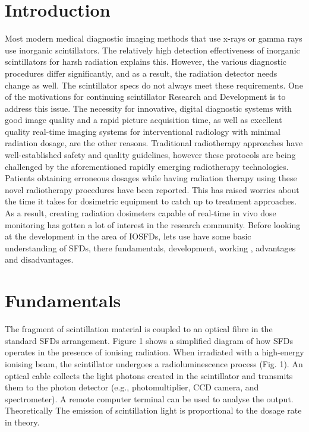 \documentclass{article}
\begin{document}
\begin{multicols}{2}

\section{Introduction}

Most modern medical diagnostic imaging methods that use x-rays or gamma rays use inorganic scintillators. The relatively high detection effectiveness of inorganic scintillators for harsh radiation explains this. However, the various diagnostic procedures differ significantly, and as a result, the radiation detector needs change as well. The scintillator specs do not always meet these requirements. One of the motivations for continuing scintillator Research and Development is to address this issue. The necessity for innovative, digital diagnostic systems with good image quality and a rapid picture acquisition time, as well as excellent quality real-time imaging systems for interventional radiology with minimal radiation dosage, are the other reasons. Traditional radiotherapy approaches have well-established safety and quality guidelines, however these protocols are being challenged by the aforementioned rapidly emerging radiotherapy technologies. Patients obtaining erroneous dosages while having radiation therapy using these novel radiotherapy procedures have been reported. This has raised worries about the time it takes for dosimetric equipment to catch up to treatment approaches. As a result, creating radiation dosimeters capable of real-time in vivo dose monitoring has gotten a lot of interest in the research community. Before looking at the development in the area of IOSFDs, lets use have some basic understanding of SFDs, there fundamentals, development, working , advantages and disadvantages.

\section{Fundamentals}
The fragment of scintillation material is coupled to an optical fibre in the standard SFDs arrangement. Figure 1 shows a simplified diagram of how SFDs operates in the presence of ionising radiation. When irradiated with a high-energy ionising beam, the scintillator undergoes a radioluminescence process (Fig. 1). An optical cable collects the light photons created in the scintillator and transmits them to the photon detector (e.g., photomultiplier, CCD camera, and spectrometer). A remote computer terminal can be used to analyse the output. Theoretically The emission of scintillation light is proportional to the dosage rate in theory. 


\end{multicols}
\end{document}
